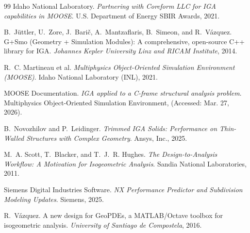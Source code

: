 \documentclass[12pt,report,justified]{SANDreport}
\begin{document}
\begin{thebibliography}{99}
Idaho National Laboratory.
\newblock \emph{Partnering with Coreform LLC for IGA capabilities in MOOSE}.
\newblock U.S. Department of Energy SBIR Awards, 2021. 

B.~Jüttler, U.~Zore, J.~Barič, A.~Mantzaflaris, B.~Simeon, and R.~Vázquez.
\newblock G+Smo (Geometry + Simulation Modules): A comprehensive, open-source C++ library for IGA.
\newblock \emph{Johannes Kepler University Linz and RICAM Institute}, 2014.

R.~C. Martineau et al.
\newblock \emph{Multiphysics Object-Oriented Simulation Environment (MOOSE)}.
\newblock Idaho National Laboratory (INL), 2021.

MOOSE Documentation.
\newblock \emph{IGA applied to a C-frame structural analysis problem}.
\newblock Multiphysics Object-Oriented Simulation Environment, (Accessed: Mar. 27, 2026).

B.~Novozhilov and P.~Leidinger.
\newblock \emph{Trimmed IGA Solids: Performance on Thin-Walled Structures with Complex Geometry}.
\newblock Ansys, Inc., 2025.

M.~A. Scott, T.~Blacker, and T.~J.~R. Hughes.
\newblock \emph{The Design-to-Analysis Workflow: A Motivation for Isogeometric Analysis}.
\newblock Sandia National Laboratories, 2011.

Siemens Digital Industries Software.
\newblock \emph{NX Performance Predictor and Subdivision Modeling Updates}.
\newblock Siemens, 2025.

R.~Vázquez.
\newblock A new design for GeoPDEs, a MATLAB/Octave toolbox for isogeometric analysis.
\newblock \emph{University of Santiago de Compostela}, 2016.

\end{thebibliography}






\end{document}
